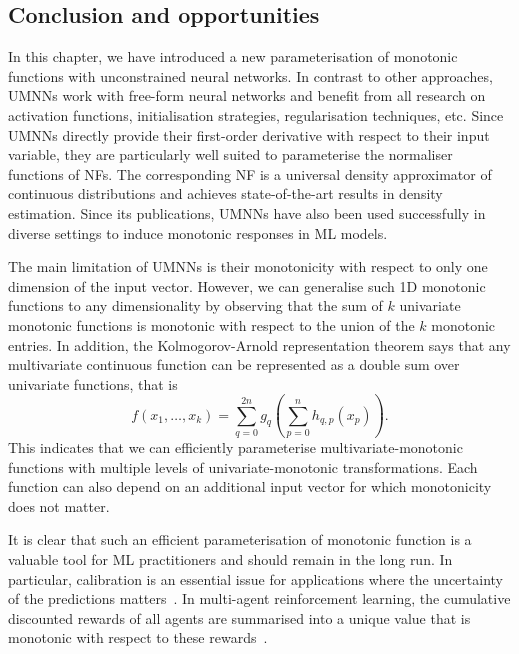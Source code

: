 \subsection{Conclusion and opportunities}


In this chapter, we have introduced a new parameterisation of monotonic functions with unconstrained neural networks. In contrast to other approaches, UMNNs work with free-form neural networks and benefit from all research on activation functions, initialisation strategies, regularisation techniques, etc. Since UMNNs directly provide their first-order derivative with respect to their input variable, they are particularly well suited to parameterise the normaliser functions of NFs. The corresponding NF is a universal density approximator of continuous distributions and achieves state-of-the-art results in density estimation. Since its publications, UMNNs have also been used successfully in diverse settings to induce monotonic responses in ML models.

The main limitation of UMNNs is their monotonicity with respect to only one dimension of the input vector. However, we can generalise such 1D monotonic functions to any dimensionality by observing that the sum of $k$ univariate monotonic functions is monotonic with respect to the union of the $k$ monotonic entries. In addition, the Kolmogorov-Arnold representation theorem says that any multivariate continuous function can be represented as a double sum over univariate functions, that is
$$ f(x_1, \dots, x_k) = \sum_{q=0}^{2n}g_q\left( \sum_{p=0}^{n} h_{q,p}(x_p) \right). $$
This indicates that we can efficiently parameterise multivariate-monotonic functions with multiple levels of univariate-monotonic transformations. Each function can also depend on an additional input vector for which monotonicity does not matter.

It is clear that such an efficient parameterisation of monotonic function is a valuable tool for ML practitioners and should remain in the long run. In particular, calibration is an essential issue for applications where the uncertainty of the predictions matters~\citep{minderer2021revisiting, guo2017calibration, cranmer2015approximating}. In multi-agent reinforcement learning, the cumulative discounted rewards of all agents are summarised into a unique value that is monotonic with respect to these rewards~\citep{rashid2018qmix, leroy2020qvmix}.

